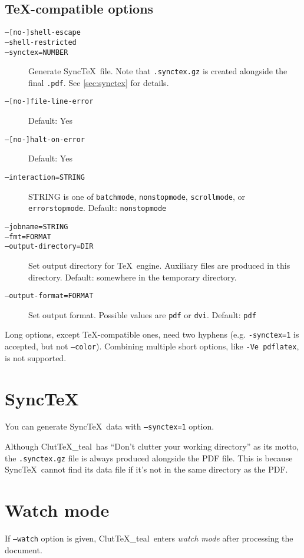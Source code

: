 \documentclass[a4paper]{report}
\newcommand\ClutTeX{Clut\TeX\_teal}
\newcommand\metavar[1]{\textnormal{\textsf{#1}}}
\begin{document}
\subsection{\TeX-compatible options}
\begin{description}
\item[\texttt{--[no-]shell-escape}]
\item[\texttt{--shell-restricted}]
\item[\texttt{--synctex=\metavar{NUMBER}}]
  Generate Sync\TeX\ file.
  Note that \texttt{.synctex.gz} is created alongside the final \texttt{.pdf}.
  See \autoref{sec:synctex} for details.
\item[\texttt{--[no-]file-line-error}]
  Default: Yes
\item[\texttt{--[no-]halt-on-error}]
  Default: Yes
\item[\texttt{--interaction=\metavar{STRING}}]
  \metavar{STRING} is one of \texttt{batchmode}, \texttt{nonstopmode}, \texttt{scrollmode}, or \texttt{errorstopmode}.
  Default: \texttt{nonstopmode}
\item[\texttt{--jobname=\metavar{STRING}}]
\item[\texttt{--fmt=\metavar{FORMAT}}]
\item[\texttt{--output-directory=\metavar{DIR}}]
  Set output directory for \TeX\ engine.
  Auxiliary files are produced in this directory.
  Default: somewhere in the temporary directory.
\item[\texttt{--output-format=\metavar{FORMAT}}]
  Set output format.
  Possible values are \texttt{pdf} or \texttt{dvi}.
  Default: \texttt{pdf}
\end{description}

Long options, except \TeX-compatible ones, need two hyphens (e.g. \texttt{-synctex=1} is accepted, but not \texttt{--color}).
Combining multiple short options, like \texttt{-Ve pdflatex}, is not supported.

\section{Sync\TeX}\label{sec:synctex}
You can generate Sync\TeX\ data with \texttt{--synctex=1} option.

Although \ClutTeX\ has ``Don't clutter your working directory'' as its motto, the \texttt{.synctex.gz} file is always produced alongside the PDF file.
This is because Sync\TeX\ cannot find its data file if it's not in the same directory as the PDF.

\section{Watch mode}\label{sec:watch-mode}
If \texttt{--watch} option is given, \ClutTeX\ enters \emph{watch mode} after processing the document.
\end{document}
